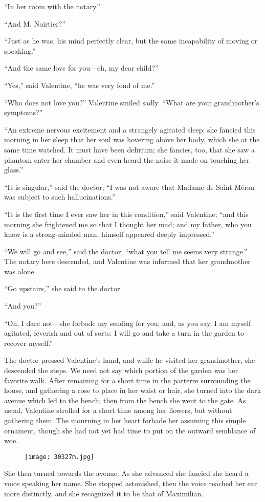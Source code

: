 “In her room with the notary.”

“And M. Noirtier?”

“Just as he was, his mind perfectly clear, but the same incapability of
moving or speaking.”

“And the same love for you—eh, my dear child?”

“Yes,” said Valentine, “he was very fond of me.”

“Who does not love you?” Valentine smiled sadly. “What are your
grandmother’s symptoms?”

“An extreme nervous excitement and a strangely agitated sleep; she
fancied this morning in her sleep that her soul was hovering above her
body, which she at the same time watched. It must have been delirium;
she fancies, too, that she saw a phantom enter her chamber and even
heard the noise it made on touching her glass.”

“It is singular,” said the doctor; “I was not aware that Madame de
Saint-Méran was subject to such hallucinations.”

“It is the first time I ever saw her in this condition,” said
Valentine; “and this morning she frightened me so that I thought her
mad; and my father, who you know is a strong-minded man, himself
appeared deeply impressed.”

“We will go and see,” said the doctor; “what you tell me seems very
strange.” The notary here descended, and Valentine was informed that
her grandmother was alone.

“Go upstairs,” she said to the doctor.

“And you?”

“Oh, I dare not—she forbade my sending for you; and, as you say, I am
myself agitated, feverish and out of sorts. I will go and take a turn
in the garden to recover myself.”

The doctor pressed Valentine’s hand, and while he visited her
grandmother, she descended the steps. We need not say which portion of
the garden was her favorite walk. After remaining for a short time in
the parterre surrounding the house, and gathering a rose to place in
her waist or hair, she turned into the dark avenue which led to the
bench; then from the bench she went to the gate. As usual, Valentine
strolled for a short time among her flowers, but without gathering
them. The mourning in her heart forbade her assuming this simple
ornament, though she had not yet had time to put on the outward
semblance of woe.

\begin{figure}[ht]
\texttt{[image: 30327m.jpg]}
\end{figure}

She then turned towards the avenue. As she advanced she fancied she
heard a voice speaking her name. She stopped astonished, then the voice
reached her ear more distinctly, and she recognized it to be that of
Maximilian.

